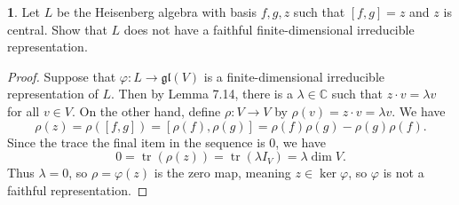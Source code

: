 \documentclass[12pt]{article}
\DeclareMathOperator{\tr}{tr}
\newcommand{\gl}{\mathfrak{gl}}
\theoremstyle{definition}
\newtheorem{ex}{}
\begin{document}
\begin{ex}
	Let $L$ be the Heisenberg algebra with basis $f, g, z$ such that $[f, g] = z$ and $z$ is central.
	Show that $L$ does not have a faithful finite-dimensional irreducible representation.
\end{ex}
\begin{proof}
    Suppose that $\varphi : L \to \gl(V)$ is a finite-dimensional irreducible representation of $L$.
    Then by Lemma 7.14, there is a $\lambda \in \mathbb{C}$ such that $z \cdot v = \lambda v$ for all $v \in V$.
    On the other hand, define $\rho : V \to V$ by $\rho(v) = z \cdot v = \lambda v$.
    We have \begin{equation*}
        \rho(z) = \rho([f, g]) = [\rho(f), \rho(g)] = \rho(f)\rho(g) - \rho(g)\rho(f).
    \end{equation*}
    Since the trace the final item in the sequence is 0, we have \begin{equation*}
        0 = \tr(\rho(z)) = \tr(\lambda I_V) = \lambda \dim V.
    \end{equation*}
    Thus $\lambda = 0$, so $\rho = \varphi(z)$ is the zero map, meaning $z \in \ker\varphi$, so $\varphi$ is not a faithful representation.
\end{proof}
\end{document}
